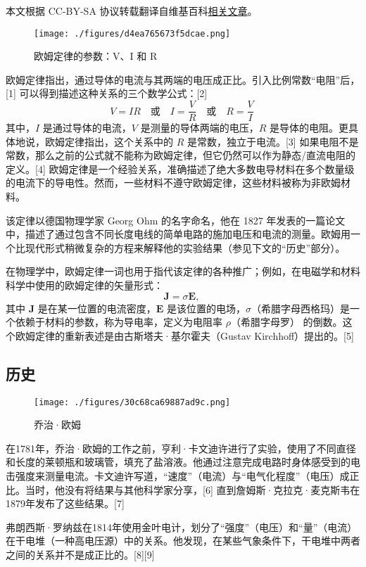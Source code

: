 
本文根据 CC-BY-SA 协议转载翻译自维基百科\href{https://en.wikipedia.org/wiki/Ohm\%27s_law}{相关文章}。

\begin{figure}[ht]
\centering
\texttt{[image: ./figures/d4ea765673f5dcae.png]}
\caption{欧姆定律的参数：V、I 和 R} \label{fig_OuMu_1}
\end{figure}
欧姆定律指出，通过导体的电流与其两端的电压成正比。引入比例常数“电阻”后，[1] 可以得到描述这种关系的三个数学公式：[2]  
\[
V = IR \quad \text{或} \quad I = \frac{V}{R} \quad \text{或} \quad R = \frac{V}{I}~
\]
其中，\(I\) 是通过导体的电流，\(V\) 是测量的导体两端的电压，\(R\) 是导体的电阻。更具体地说，欧姆定律指出，这个关系中的 \(R\) 是常数，独立于电流。[3] 如果电阻不是常数，那么之前的公式就不能称为欧姆定律，但它仍然可以作为静态/直流电阻的定义。[4] 欧姆定律是一个经验关系，准确描述了绝大多数电导材料在多个数量级的电流下的导电性。然而，一些材料不遵守欧姆定律，这些材料被称为非欧姆材料。

该定律以德国物理学家 Georg Ohm 的名字命名，他在 1827 年发表的一篇论文中，描述了通过包含不同长度电线的简单电路的施加电压和电流的测量。欧姆用一个比现代形式稍微复杂的方程来解释他的实验结果（参见下文的“历史”部分）。

在物理学中，欧姆定律一词也用于指代该定律的各种推广；例如，在电磁学和材料科学中使用的欧姆定律的矢量形式：
\[
\mathbf{J} = \sigma \mathbf{E},~
\]
其中 \( \mathbf{J} \) 是在某一位置的电流密度，\( \mathbf{E} \) 是该位置的电场，\( \sigma \)（希腊字母西格玛）是一个依赖于材料的参数，称为导电率，定义为电阻率 \( \rho \)（希腊字母罗） 的倒数。这个欧姆定律的重新表述是由古斯塔夫·基尔霍夫（Gustav Kirchhoff）提出的。[5]
\subsection{历史}
\begin{figure}[ht]
\centering
\texttt{[image: ./figures/30c68ca69887ad9c.png]}
\caption{乔治·欧姆} \label{fig_OuMu_2}
\end{figure}
在1781年，乔治·欧姆的工作之前，亨利·卡文迪许进行了实验，使用了不同直径和长度的莱顿瓶和玻璃管，填充了盐溶液。他通过注意完成电路时身体感受到的电击强度来测量电流。卡文迪许写道，“速度”（电流）与“电气化程度”（电压）成正比。当时，他没有将结果与其他科学家分享，[6] 直到詹姆斯·克拉克·麦克斯韦在1879年发布了这些结果。[7]

弗朗西斯·罗纳兹在1814年使用金叶电计，划分了“强度”（电压）和“量”（电流）在干电堆（一种高电压源）中的关系。他发现，在某些气象条件下，干电堆中两者之间的关系并不是成正比的。[8][9]

